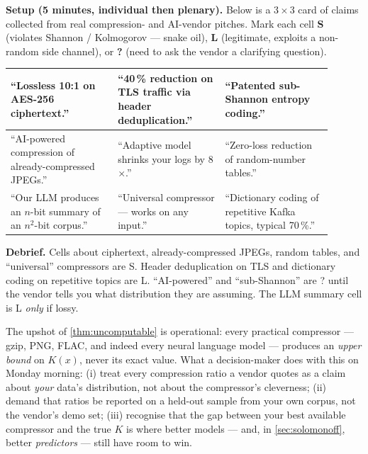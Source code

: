 \documentclass[12pt,a4paper]{article}
\theoremstyle{plain}
\theoremstyle{definition}
\begin{document}
\begin{activity}[title={Activity 3 --- Snake-oil bingo}]
\label{act:bingo}
\textbf{Setup (5 minutes, individual then plenary).}  Below is a
$3\times 3$ card of claims collected from real compression- and
AI-vendor pitches.  Mark each cell \textbf{S} (violates Shannon /
Kolmogorov --- snake oil), \textbf{L} (legitimate, exploits a
non-random side channel), or \textbf{?} (need to ask the vendor a
clarifying question).

\begin{center}
\small
\begin{tabular}{|p{0.3\linewidth}|p{0.3\linewidth}|p{0.3\linewidth}|}
\hline
``Lossless 10:1 on AES-256 ciphertext.'' &
``40\,\% reduction on TLS traffic via header deduplication.'' &
``Patented sub-Shannon entropy coding.'' \\
\hline
``AI-powered compression of already-compressed JPEGs.'' &
``Adaptive model shrinks your logs by 8$\times$.'' &
``Zero-loss reduction of random-number tables.'' \\
\hline
``Our LLM produces an $n$-bit summary of an $n^2$-bit corpus.'' &
``Universal compressor --- works on any input.'' &
``Dictionary coding of repetitive Kafka topics, typical 70\,\%.'' \\
\hline
\end{tabular}
\end{center}

\textbf{Debrief.}  Cells about ciphertext, already-compressed JPEGs,
random tables, and ``universal'' compressors are S.  Header
deduplication on TLS and dictionary coding on repetitive topics are L.
``AI-powered'' and ``sub-Shannon'' are ? until the vendor tells you
what distribution they are assuming.  The LLM summary cell is L
\emph{only} if lossy.
\end{activity}

\medskip

The upshot of \cref{thm:uncomputable} is operational: every practical
compressor --- gzip, PNG, FLAC, and indeed every neural language model
--- produces an \emph{upper bound} on $K(x)$, never its exact value.
What a decision-maker does with this on Monday morning: (i) treat
every compression ratio a vendor quotes as a claim about \emph{your}
data's distribution, not about the compressor's cleverness; (ii)
demand that ratios be reported on a held-out sample from your own
corpus, not the vendor's demo set; (iii) recognise that the gap
between your best available compressor and the true $K$ is where
better models --- and, in \cref{sec:solomonoff}, better
\emph{predictors} --- still have room to win.
\end{document}
